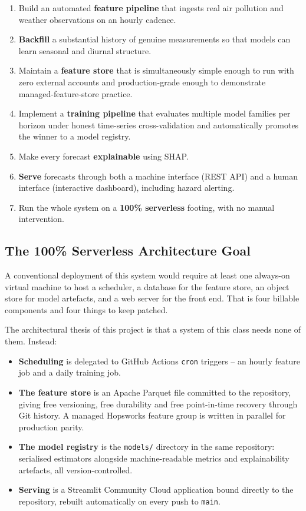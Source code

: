 \documentclass[11pt,a4paper]{article}
\begin{document}
\begin{enumerate}[itemsep=2pt]
  \item Build an automated \textbf{feature pipeline} that ingests real air
        pollution and weather observations on an hourly cadence.
  \item \textbf{Backfill} a substantial history of genuine measurements so
        that models can learn seasonal and diurnal structure.
  \item Maintain a \textbf{feature store} that is simultaneously simple enough
        to run with zero external accounts and production-grade enough to
        demonstrate managed-feature-store practice.
  \item Implement a \textbf{training pipeline} that evaluates multiple model
        families per horizon under honest time-series cross-validation and
        automatically promotes the winner to a model registry.
  \item Make every forecast \textbf{explainable} using SHAP.
  \item \textbf{Serve} forecasts through both a machine interface (REST API)
        and a human interface (interactive dashboard), including hazard
        alerting.
  \item Run the whole system on a \textbf{100\% serverless} footing, with no
        manual intervention.
\end{enumerate}

\subsection{The 100\% Serverless Architecture Goal}

A conventional deployment of this system would require at least one always-on
virtual machine to host a scheduler, a database for the feature store, an
object store for model artefacts, and a web server for the front end. That is
four billable components and four things to keep patched.

The architectural thesis of this project is that a system of this class needs
none of them. Instead:

\begin{itemize}[itemsep=2pt]
  \item \textbf{Scheduling} is delegated to GitHub Actions \texttt{cron}
        triggers -- an hourly feature job and a daily training job.
  \item \textbf{The feature store} is an Apache Parquet file committed to the
        repository, giving free versioning, free durability and free
        point-in-time recovery through Git history. A managed Hopsworks
        feature group is written in parallel for production parity.
  \item \textbf{The model registry} is the \texttt{models/} directory in the
        same repository: serialised estimators alongside machine-readable
        metrics and explainability artefacts, all version-controlled.
  \item \textbf{Serving} is a Streamlit Community Cloud application bound
        directly to the repository, rebuilt automatically on every push to
        \texttt{main}.
\end{itemize}
\end{document}
